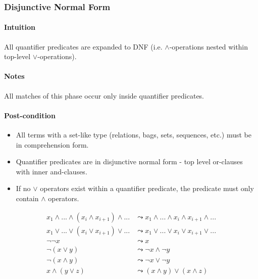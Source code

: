 \documentclass{article}
\begin{document}
\subsubsection{Disjunctive Normal Form}

\paragraph{Intuition} All quantifier predicates are expanded to DNF (i.e. $\land$-operations nested within top-level $\lor$-operations).

\paragraph{Notes} All matches of this phase occur only inside quantifier predicates.

\paragraph{Post-condition}
\begin{itemize}
  \item All terms with a set-like type (relations, bags, sets, sequences, etc.) must be in comprehension form.
  \item Quantifier predicates are in disjunctive normal form - top level or-clauses with inner and-clauses.
  \item If no $\lor$ operators exist within a quantifier predicate, the predicate must only contain $\land$ operators.
\end{itemize}

\noindent\begin{minipage}{\linewidth} %
\begin{align}
  \tag{Flatten Nested $\land$}
  x_1 \land ... \land (x_i \land x_{i+1}) \land ...
  &\leadsto
  x_1 \land ... \land x_i \land x_{i+1} \land ...
  \\
  \tag{Flatten Nested $\lor$}
  x_1 \lor ... \lor (x_i \lor x_{i+1}) \lor ...
  &\leadsto
  x_1 \lor ... \lor x_i \lor x_{i+1} \lor ...
  \\
  \tag{Double Negation}
  \lnot \lnot x
  &\leadsto
  x
  \\
  \tag{Distribute De Morgan - Or}
  \lnot (x \lor y)
  &\leadsto
  \lnot x \land \lnot y
  \\
  \tag{Distribute De Morgan - And}
  \lnot (x \land y)
  &\leadsto
  \lnot x \lor \lnot y
  \\
  \tag{Distribute $\land$ over $\lor$}
  x \land (y \lor z)
  &\leadsto
  (x \land y) \lor (x \land z)
\end{align}
\end{minipage}
\end{document}
